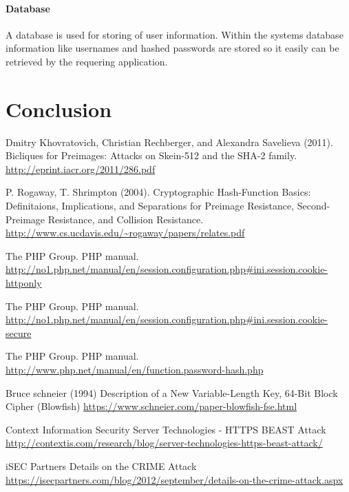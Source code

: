 \documentclass[11pt, a4paper]{article}
\begin{document}
\paragraph{Database}
A database is used for storing of user information. Within the systems database information like usernames and hashed passwords are stored so it easily can be retrieved by the requering application.
 
\section{Conclusion}

\begin{thebibliography}{9}

    Dmitry Khovratovich, Christian Rechberger, and Alexandra Savelieva (2011).
    Bicliques for Preimages: Attacks on Skein-512 and the SHA-2 family.
    \url{http://eprint.iacr.org/2011/286.pdf}

    P. Rogaway, T. Shrimpton (2004).
    Cryptographic Hash-Function Basics: Definitaions, Implications, and Separations for Preimage Resistance, Second-Preimage Resistance, and Collision Resistance.
    \url{http://www.cs.ucdavis.edu/~rogaway/papers/relates.pdf}

    The PHP Group.
    PHP manual.
    \url{http://no1.php.net/manual/en/session.configuration.php#ini.session.cookie-httponly}
    
    The PHP Group.
    PHP manual.
    \url{http://no1.php.net/manual/en/session.configuration.php#ini.session.cookie-secure}

    The PHP Group.
    PHP manual.
    \url{http://www.php.net/manual/en/function.password-hash.php}

    Bruce schneier (1994)
    Description of a New Variable-Length Key, 64-Bit Block Cipher (Blowfish)
    \url{https://www.schneier.com/paper-blowfish-fse.html}

    Context Information Security
    Server Technologies - HTTPS BEAST Attack
    \url{http://contextis.com/research/blog/server-technologies-https-beast-attack/}

    iSEC Partners
    Details on the CRIME Attack
    \url{https://isecpartners.com/blog/2012/september/details-on-the-crime-attack.aspx}

\end{thebibliography}
\end{document}
